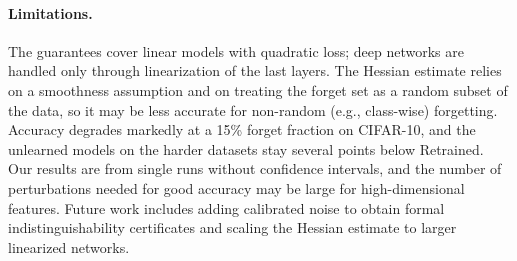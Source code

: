 \documentclass[10pt,twocolumn,letterpaper]{article}
\begin{document}
\paragraph{Limitations.} The guarantees cover linear models with quadratic loss; deep networks are handled only through linearization of the last layers. The Hessian estimate relies on a smoothness assumption and on treating the forget set as a random subset of the data, so it may be less accurate for non-random (e.g., class-wise) forgetting. Accuracy degrades markedly at a 15\% forget fraction on CIFAR-10, and the unlearned models on the harder datasets stay several points below Retrained. Our results are from single runs without confidence intervals, and the number of perturbations needed for good accuracy may be large for high-dimensional features. Future work includes adding calibrated noise to obtain formal indistinguishability certificates and scaling the Hessian estimate to larger linearized networks.

{
    \small
    
    
}
\end{document}
